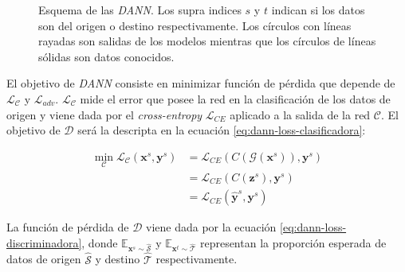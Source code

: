 \begin{figure}[H]

  \caption[Esquema de {\it DANN}]{Esquema de las {\it DANN}. Los supra indices $s$ y $t$ indican si los datos son del origen o destino respectivamente.
    Los círculos con líneas rayadas son salidas de los modelos mientras que los círculos de líneas sólidas son datos conocidos.}
  \label{fig:dann-esquema}
\end{figure}

El objetivo de {\it DANN} consiste en minimizar función de pérdida que depende de $\mathcal{L}_\mathcal{C}$ y
$\mathcal{L}_{adv}$. $\mathcal{L}_\mathcal{C}$ mide el error que posee la red en la clasificación de los datos de
origen y viene dada por el {\it cross-entropy} $\mathcal{L}_{CE}$ aplicado a la salida de la red $\mathcal{C}$. El
objetivo de $\mathcal{D}$ será la descripta en la ecuación \ref{eq:dann-loss-clasificadora}:

\begin{align}
  \min_{\mathcal{C}} \mathcal{L}_\mathcal{C}(\mathbf{x}^s, \mathbf{y}^s) & = \mathcal{L}_{CE}(C(\mathcal{G}(\mathbf{x}^s)), \mathbf{y}^s) \nonumber \\
                                                                         & = \mathcal{L}_{CE}(C(\mathbf{z}^s), \mathbf{y}^s) \nonumber              \\
                                                                         & = \mathcal{L}_{CE}(\hat{\mathbf{y}}^s, \mathbf{y}^s)
  \label{eq:dann-loss-clasificadora}
\end{align}

La función de pérdida de $\mathcal{D}$ viene dada por la ecuación \ref{eq:dann-loss-discriminadora}, donde
$\mathbb{E}_{\mathbf{x}^s \sim \mathcal{\hat{S}}}$ y $\mathbb{E}_{\mathbf{x}^t \sim \mathcal{\hat{T}}}$ representan la
proporción esperada de datos de origen $\mathcal{\hat{S}}$ y destino $\mathcal{\hat{T}}$ respectivamente.

